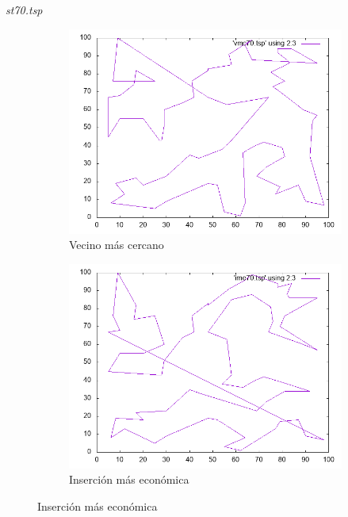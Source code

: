 \documentclass{beamer}
\begin{document}
\begin{frame}[fragile]{\textit{st70.tsp}}
\begin{figure}[H]
\centering
\begin{subfigure}[b]{0.36\textwidth}
\includegraphics[width=\textwidth]{st70_vmc.png}
\caption*{\small{Vecino más cercano}}
\end{subfigure}
\quad
\begin{subfigure}[b]{0.36\textwidth}
\includegraphics[width=\textwidth]{st70_ime.png}
\caption*{\small{Inserción más económica}}
\end{subfigure}

\vspace{0.25cm}


\end{figure}
\end{frame}
\end{document}
